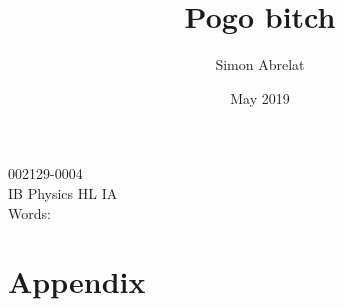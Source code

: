 \documentclass[12pt, letterpaper]{article}
\title{Pogo bitch}
\author{Simon Abrelat}
\date{May 2019}
\begin{document}
\large
\doublespace{}
\parindent=0.5in

{\fontsize{12}{14.4}
  {\singlespace
    \maketitle
    \begin{center}
    002129-0004 \\
    \vspace{4mm}
    IB Physics HL IA \\
    \vspace{4mm}
    Words:  \\ %
    \end{center}
  }
}	


\newpage
\tableofcontents
{}
\newpage

\section{}

\newpage
\printbibliography{}

\newpage
\section{Appendix}
\listoffigures{}
\end{document}
